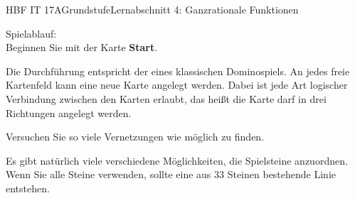 \documentclass[oneside,openany,headings=optiontotoc,11pt,numbers=noenddot]{scrreprt}
\begin{document}
\begin{worksheet}{HBF IT 17A}{Grundstufe}{Lernabschnitt 4: Ganzrationale Funktionen}
\begin{framed}
			\small{\color{codegray}Spielablauf:}\\
			\normalsize\color{black}
			Beginnen Sie mit der Karte \textbf{Start}. 
			\par\bigskip\noindent
			Die Durchführung entspricht der eines klassischen Dominospiels. An jedes freie Kartenfeld kann eine neue Karte angelegt werden. Dabei ist jede Art logischer Verbindung zwischen den Karten erlaubt, das heißt die Karte darf in drei Richtungen angelegt werden.\\
			\par\bigskip\noindent
			Versuchen Sie so viele Vernetzungen wie möglich zu finden.\\
			\par\bigskip
			\tiny{\color{codegray}Es gibt natürlich viele verschiedene Möglichkeiten, die Spielsteine anzuordnen. Wenn Sie alle Steine verwenden, sollte eine aus 33 Steinen bestehende Linie entstehen.}
		\end{framed}
	\end{worksheet}
\end{document}
